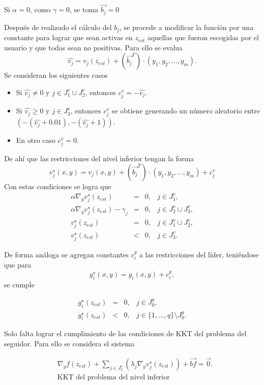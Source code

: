 Si $\alpha=0$, como $\gamma=0$, se toma  $\vec{b_j}=0$
            
Después de realizado el cálculo del $b_j$, se procede a modificar la función por una constante para lograr que sean activas en $z_{est}$ aquellas que fueron escogidas por el usuario y que todas sean no positivas. Para ello se evalua $$\hat{v_j}=v_{j}(z_{est})+ ({\vec{b_j}}^T)\cdot (y_1,y_2,\dots,y_m).$$ Se consideran los siguientes casos
\begin{itemize}
    \item Si $\hat{v_j}\neq 0$ y $j\in J_1^v\cup J_2^v$, entonces $c_j^v=-\hat{v_j}$.
\item Si $\hat{v_j}\geq 0$ y $j\in J_3^v$,  entonces  $c_j^v$ se obtiene generando un número aleatorio entre $(-(\hat{v_j}+0.01), -(\hat{v_j}+1))$.
\item En otro caso $c_j^v=0$.\end{itemize}

De ahí que las restricciones del nivel inferior tengan la forma 
\begin{equation}
	v_{j}^{\star}(x,y)=v_{j}(x,y)+ ({\vec{b_j}}^T)\cdot (y_1,y_2,\dots,y_m)+c_j^v
\end{equation}
%
Con estas condiciones se logra que 
$$\begin{array}{rcll} \alpha \nabla_y v_{j}^{\star}(z_{est})&=&0,& j\in J_1^v,\\ \alpha \nabla_y v_{j}^{\star}(z_{est})-\gamma_j&=&0,& j\in J_2^v\cup J_3^v,\\
  v_{j}^{\star}(z_{est})&=&0,& j\in J_1^v\cup J_2^v, \\  v_{j}^{\star}(z_{est})&<&0,& j\in J_3^v.\end{array}$$

De forma análoga se agregan constantes  $c_i^g$  a las restricciones del líder,  teniéndose que para $$g_{i}^{\star}(x,y)=g_{i}(x,y)+c_i^g,$$ se cumple

$$\begin{array}{rcll} 
  g_{i}^{\star}(z_{est})&=&0,& j\in J_0^g,\\  g_{i}^{\star}(z_{est})&<&0,& j\in \{1, \ldots, q\}\setminus J_0^g.\end{array}$$

Solo falta lograr el cumplimiento de las condiciones de KKT del problema del seguidor. Para ello se considera el sistema 

\begin{equation}
    \begin{aligned}
        &\nabla_{y}f(z_{est})+\sum_{j \in J_2^v}(\lambda_j\nabla_{y}v_{j}^{\star}(z_{est}))+\vec{bf}=\vec{0}.\\
        &\text{KKT del problema del nivel inferior}
    \end{aligned}
    \label{KKT_nivel_inferior}
\end{equation}

